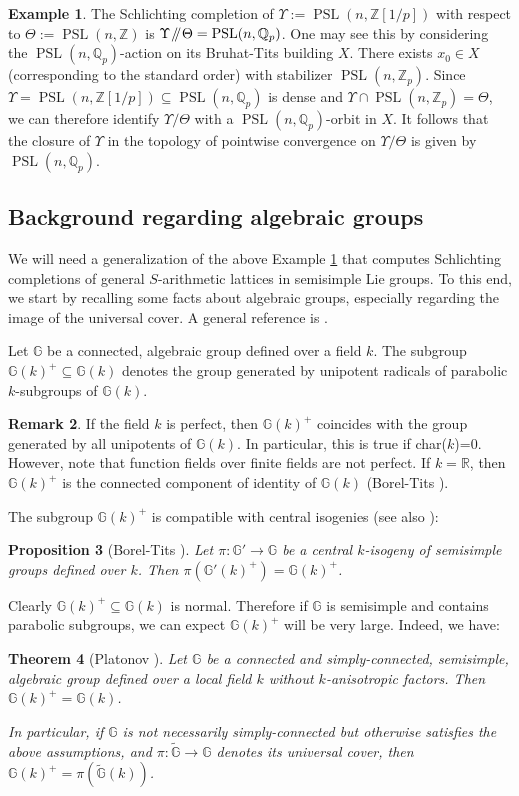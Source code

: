 \documentclass[JEP,XML,SOM,Unicode,published]{cedram}
\newcommand{\Y}{\ensuremath{\Upsilon}}
\newcommand{\sslash}{\mathbin{\mkern-3mu /\mkern-5mu/ \mkern-3mu}}
\newcommand{\bbG}{\ensuremath{\mathbb{G}}}
\newcommand{\bbQ}{\ensuremath{\mathbb{Q}}}
\newcommand{\bbR}{\ensuremath{\mathbb{R}}}
\newcommand{\bbZ}{\ensuremath{\mathbb{Z}}}
\DeclareMathOperator{\PSL}{PSL}
\newtheorem{thm}{Theorem}[section]
\newtheorem{prop}[thm]{Proposition}
\theoremstyle{definition}
\newtheorem{rem}[thm]{Remark}
\newtheorem{ex}[thm]{Example}
\begin{document}
\begin{ex}\label{ex:schlichting-arithmetic}
The Schlichting completion of $\Y:=\PSL(n,\bbZ[1/p])$ with respect to $\Theta:=\PSL(n,\bbZ)$ is $\Y\sslash\Theta=\PSL(n,\bbQ_p)$. One may see this by considering the $\PSL(n,\bbQ_p)$-action on its Bruhat-Tits building $X$. There exists $x_0\in X$ (corresponding to the standard order) with stabilizer $\PSL(n,\bbZ_p)$. Since $\Y=\PSL(n,\bbZ[1/p])\subseteq\PSL(n,\bbQ_p)$ is dense and $\Y\cap \PSL(n,\bbZ_p)=\Theta$, we can therefore identify $\Y/\Theta$ with a $\PSL(n,\bbQ_p)$-orbit in $X$. It follows that the closure of $\Y$ in the topology of pointwise convergence on $\Y/\Theta$ is given by $\PSL(n,\bbQ_p)$.
\end{ex}

\subsection{Background regarding algebraic groups}\label{sec:back}
We will need a generalization of the above Example \ref{ex:schlichting-arithmetic} that computes Schlichting completions of general $S$-arithmetic lattices in semisimple Lie groups. To this end, we start by recalling some facts about algebraic groups, especially regarding the image of the universal cover. A general reference is \cite[\S\S 1.1 \& 1.2]{margulis-book}.

Let $\bbG$ be a connected, algebraic group defined over a field $k$. The subgroup $\bbG(k)^+\subseteq \bbG(k)$ denotes the group generated by unipotent radicals of parabolic $k$-subgroups of $\bbG(k)$.

\begin{rem} If the field $k$ is perfect, then $\bbG(k)^+$ coincides with the group generated by all unipotents of $\bbG(k)$. In particular, this is true if char($k$)=0. However, note that function fields over finite fields are not perfect. If $k=\bbR$, then $\bbG(k)^+$ is the connected component of identity of $\bbG(k)$ (Borel-Tits \cite[Prop.\,6.14]{borel-tits-morphismes-abstraits}).\end{rem}
The subgroup $\bbG(k)^+$ is compatible with central isogenies (see also \cite[Prop.\,I.1.5.5]{margulis-book}):
\begin{prop}[{Borel-Tits \cite[Cor.\,6.3]{borel-tits-morphismes-abstraits}}]\label{prop:plus-isogeny}
Let $\pi:\bbG'\to \bbG$ be a central $k$\nobreakdash-isogeny of semisimple groups defined over $k$. Then $\pi(\bbG'(k)^+)=\bbG(k)^+$. \end{prop}
Clearly $\bbG(k)^+\subseteq \bbG(k)$ is normal. Therefore if $\bbG$ is semisimple and contains parabolic subgroups, we can expect $\bbG(k)^+$ will be very large. Indeed, we have:
\begin{thm}[{Platonov \cite{platonov-ktconj}}]\label{thm:ktconj}
Let $\bbG$ be a connected and simply-connected, semisimple, algebraic group defined over a local field $k$ without $k$-anisotropic factors. Then $\bbG(k)^+=\bbG(k)$.

In particular, if $\bbG$ is not necessarily simply-connected but otherwise satisfies the above assumptions, and $\pi:\widetilde{\bbG}\to\bbG$ denotes its universal cover, then $\bbG(k)^+=\pi(\widetilde{\bbG}(k))$.
\end{thm}
\end{document}
